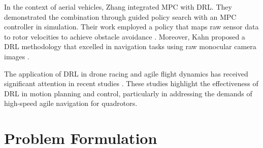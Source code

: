 \documentclass[letterpaper,journal,twoside]{IEEEtran}
\begin{document}
In the context of aerial vehicles, Zhang \etal integrated MPC with DRL. 
They demonstrated the combination through guided policy search 
with an MPC controller in simulation. 
Their work employed a policy that maps raw sensor data to rotor 
velocities to achieve obstacle avoidance \cite{zhang2016learning}. 
Moreover, Kahn \etal proposed a DRL methodology that excelled in 
navigation tasks using raw monocular camera images \cite{kahn2018self}.

The application of DRL in drone racing and agile flight dynamics 
has received significant attention in recent studies \cite{loquercio2019deep, song2021autonomous, song2022policy, penicka2022learning, song2023reaching}. 
These studies highlight the effectiveness of DRL in motion 
planning and control, particularly in addressing the demands of 
high-speed agile navigation for quadrotors.


\section{Problem Formulation}
\end{document}
